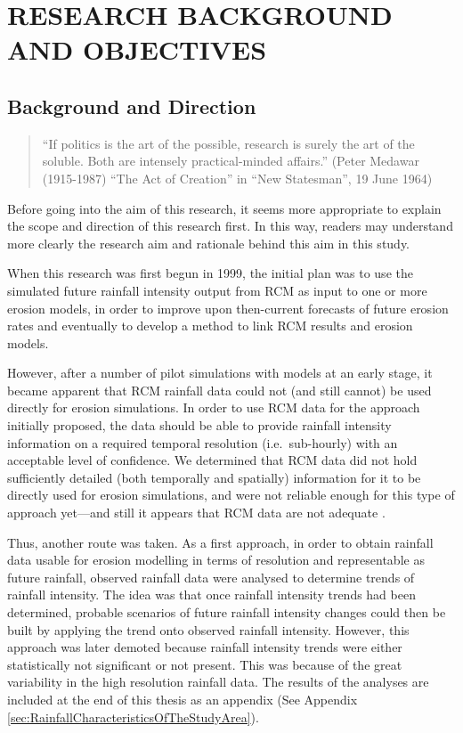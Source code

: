\chapter{RESEARCH BACKGROUND AND OBJECTIVES}
\label{sec:RESEARCHOBJECTIVES}

\section{Background and Direction}
\label{sec:ResearchBackgroundandDirection}

\begin{quotation}
\small ``If politics is the art of the possible, research is surely the art of
the soluble. Both are intensely practical-minded affairs.'' (Peter Medawar
(1915-1987) ``The Act of Creation'' in ``New Statesman'', 19 June 1964)
\end{quotation}

Before going into the aim of this research, it seems more appropriate to explain
the scope and direction of this research first. In this way, readers may
understand more clearly the research aim and rationale behind this aim in this
study.

When this research was first begun in 1999, the initial plan was to use the
simulated future rainfall intensity output from RCM as input to one or more
erosion models, in order to improve upon then-current forecasts of future
erosion rates and eventually to develop a method to link RCM results and erosion
models.

However, after a number of pilot simulations with models at an early stage, it
became apparent that RCM rainfall data could not (and still cannot) be used
directly for erosion simulations. In order to use RCM data for the approach
initially proposed, the data should be able to provide rainfall intensity
information on a required temporal resolution (i.e.\ sub-hourly) with an
acceptable level of confidence. We determined that RCM data did not hold
sufficiently detailed (both temporally and spatially) information for it to
be directly used for erosion simulations, and were not
reliable enough for this type of approach yet---and still it appears that
RCM data are not adequate \citep{nearing2001-229,michael2005-155,o'neal2005-165,
gornall2010-2973,mullan2012-18}.

Thus, another route was taken. As a first approach, in order to obtain
rainfall data usable for erosion modelling in terms of resolution and
representable as future rainfall, observed rainfall data were analysed to
determine trends of rainfall intensity. The idea was that once rainfall
intensity trends had been determined, probable scenarios of future rainfall
intensity changes could then be built by applying the trend onto observed
rainfall intensity. However, this approach was later demoted because rainfall
intensity trends were either statistically not significant or not present. This
was because of the great variability in the high resolution rainfall data. The
results of the analyses are included at the end of this thesis as an appendix
(See Appendix \ref{sec:RainfallCharacteristicsOfTheStudyArea}).

